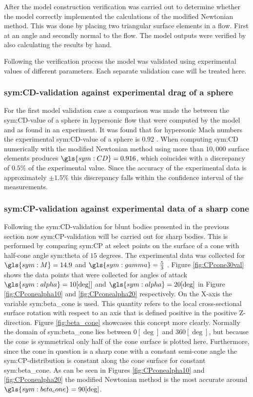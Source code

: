 After the model construction verification was carried out to determine whether the model correctly implemented the calculations of the modified Newtonian method. This was done by placing two triangular surface elements in a flow. First at an angle and secondly normal to the flow. The model outputs were verified by also calculating the results by hand.

Following the verification process the model was validated using experimental values of different parameters. Each separate validation case will be treated here.

\subsubsection{\acrshort{sym:CD}-validation against experimental drag of a sphere}
\label{subsubsec:valsphere}
For the first model validation case a comparison was made the between the \gls{sym:CD}-value of a sphere in hypersonic flow that were computed by the model and as found in an experiment. It was found that for hypersonic Mach numbers the experimental \gls{sym:CD}-value of a sphere is $0.92$ \cite{Bailey1966,AndersonJr.2007,Cox1965}. When computing \gls{sym:CD} numerically with the modified Newtonian method using more than $10,000$ surface elements produces $\gls{sym:CD}=0.916$, which coincides with a discrepancy of $0.5\%$ of the experimental value. Since the accuracy of the experimental data is approximately $\pm1.5\%$ \cite{Bailey1966} this discrepancy falls within the confidence interval of the measurements.

\subsubsection{\acrshort{sym:CP}-validation against experimental data of a sharp cone}
\label{subsubsec:valsharpconeCP}
Following the \gls{sym:CD}-validation for blunt bodies presented in the previous section now \gls{sym:CP}-validation will be carried out for sharp bodies. This is performed by comparing \gls{sym:CP} at select points on the surface of a cone with half-cone angle \gls{sym:theta} of $15$ degrees. The experimental data was collected for $\gls{sym:M}=14.9$ and $\gls{sym:gamma}=\frac{5}{3}$  \cite{Bertin1994,Cleary1970}. Figure \ref{fig:CPcone30val} shows the data points that were collected for angles of attack $\gls{sym:alpha}=10[\deg]]$ and $\gls{sym:alpha}=20[\deg]$ in Figure \ref{fig:CPconealpha10} and \ref{fig:CPconealpha20} respectively. On the X-axis the variable \gls{sym:beta_cone} is used. This quantity refers to the local cross-sectional surface rotation with respect to an axis that is defined positive in the positive Z-direction. Figure \ref{fig:beta_cone} showcases this concept more clearly. Normally the domain of \gls{sym:beta_cone} lies between $0[\deg]$ and $360[\deg]$, but because the cone is symmetrical only half of the cone surface is plotted here. Furthermore, since the cone in question is a sharp cone with a constant semi-cone angle the \gls{sym:CP}-distribution is constant along the cone surface for constant \gls{sym:beta_cone}.
As can be seen in Figures \ref{fig:CPconealpha10} and \ref{fig:CPconealpha20} the modified Newtonian method is the most accurate around $\gls{sym:beta_cone}=90[\deg]$.

